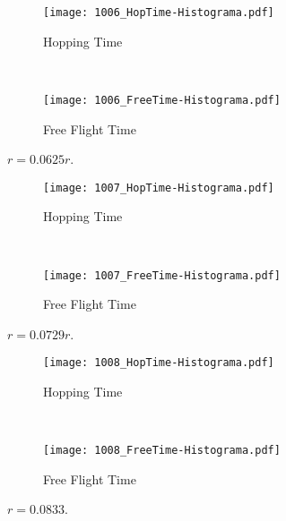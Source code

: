\documentclass[a4paper,10pt]{article}
\begin{document}
\begin{figure}[h]
        \centering
        \begin{subfigure}[b]{0.45\textwidth}
                \centering
                \texttt{[image: 1006\_HopTime-Histograma.pdf]}
                \caption{Hopping Time}              
        \end{subfigure}%
        ~ %
        \begin{subfigure}[b]{0.45\textwidth}
                \centering
                \texttt{[image: 1006\_FreeTime-Histograma.pdf]}
                \caption{Free Flight Time}                
        \end{subfigure}       
        \caption{ $r=0.0625r$. }
\end{figure}


\begin{figure}[h]
        \centering
        \begin{subfigure}[b]{0.45\textwidth}
                \centering
                \texttt{[image: 1007\_HopTime-Histograma.pdf]}
                \caption{Hopping Time}              
        \end{subfigure}%
        ~ %
        \begin{subfigure}[b]{0.45\textwidth}
                \centering
                \texttt{[image: 1007\_FreeTime-Histograma.pdf]}
                \caption{Free Flight Time}                
        \end{subfigure}       
        \caption{ $r=0.0729r$. }
\end{figure}



\begin{figure}[h]
        \centering
        \begin{subfigure}[b]{0.45\textwidth}
                \centering
                \texttt{[image: 1008\_HopTime-Histograma.pdf]}
                \caption{Hopping Time}              
        \end{subfigure}%
        ~ %
        \begin{subfigure}[b]{0.45\textwidth}
                \centering
                \texttt{[image: 1008\_FreeTime-Histograma.pdf]}
                \caption{Free Flight Time}                
        \end{subfigure}       
        \caption{ $r=0.0833$. }
\end{figure}
\end{document}
